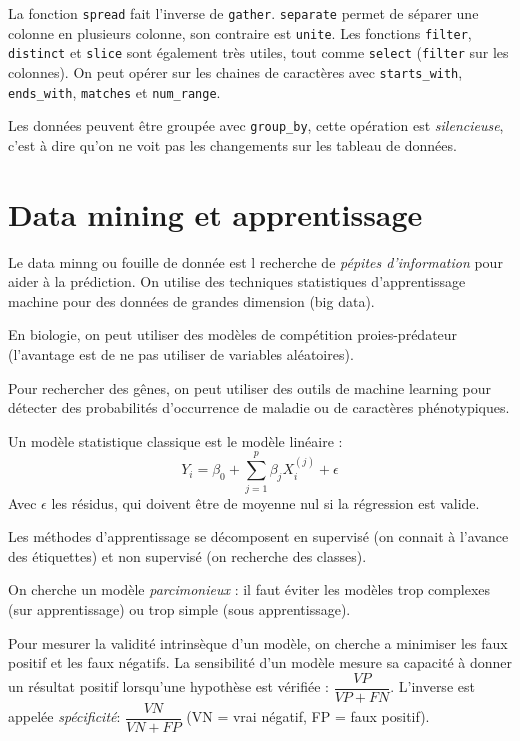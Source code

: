 \documentclass{article}
\begin{document}
La fonction \texttt{spread} fait l'inverse de \texttt{gather}. \texttt{separate} permet de séparer une colonne en plusieurs colonne, son contraire est \texttt{unite}. Les fonctions \texttt{filter}, \texttt{distinct} et \texttt{slice} sont également très utiles, tout comme \texttt{select} (\texttt{filter} sur les colonnes). On peut opérer sur les chaines de caractères avec \texttt{starts\_with}, \texttt{ends\_with}, \texttt{matches} et \texttt{num\_range}.

Les données peuvent être groupée avec \texttt{group\_by}, cette opération est \emph{silencieuse}, c'est à dire qu'on ne voit pas les changements sur les tableau de données.

\section{Data mining et apprentissage}
Le data minng ou fouille de donnée est l recherche de \emph{pépites d'information} pour aider à la prédiction. On utilise des techniques statistiques d'apprentissage machine pour des données de grandes dimension (big data).


En biologie, on peut utiliser des modèles de compétition proies-prédateur (l'avantage est de ne pas utiliser de variables aléatoires).

Pour rechercher des gênes, on peut utiliser des outils de machine learning pour détecter des probabilités d'occurrence de maladie ou de caractères phénotypiques.
\bigskip

Un modèle statistique classique est le modèle linéaire :
\[Y_i = \beta_0 + \sum_{j=1}^p \beta_jX_i^{(j)}+ \epsilon\]
Avec $\epsilon$ les résidus, qui doivent être de moyenne nul si la régression est valide.

Les méthodes d'apprentissage se décomposent en supervisé (on connait à l'avance des étiquettes) et non supervisé (on recherche des classes).

On cherche un modèle \emph{parcimonieux} : il faut éviter les modèles trop complexes (sur apprentissage) ou trop simple (sous apprentissage).

Pour mesurer la validité intrinsèque d'un modèle, on cherche a minimiser les faux positif et les faux négatifs. La sensibilité d'un modèle mesure sa capacité à donner un résultat positif lorsqu'une hypothèse est vérifiée : $\dfrac{VP}{VP+FN}$. L'inverse est appelée \emph{spécificité}: $\dfrac{VN}{VN+FP}$ (VN = vrai négatif, FP = faux positif).
\end{document}
